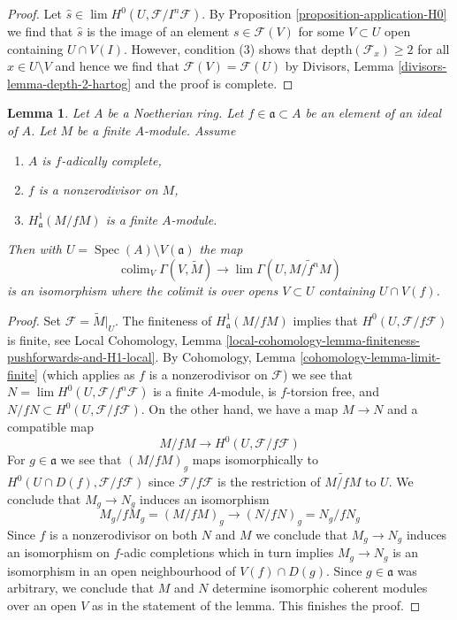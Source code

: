 \documentclass{stacks-project}
\theoremstyle{plain}
\newtheorem{lemma}[subsection]{Lemma}
\theoremstyle{definition}
\theoremstyle{remark}
\numberwithin{equation}{subsection}
\def\lim{\mathop{\mathrm{lim}}\nolimits}
\def\colim{\mathop{\mathrm{colim}}\nolimits}
\def\Spec{\mathop{\mathrm{Spec}}}
\begin{document}
\begin{proof}
Let $\hat s \in \lim H^0(U, \mathcal{F}/I^n\mathcal{F})$.
By Proposition \ref{proposition-application-H0}
we find that $\hat s$ is the image of an element $s \in \mathcal{F}(V)$
for some $V \subset U$ open containing $U \cap V(I)$.
However, condition (3) shows that $\text{depth}(\mathcal{F}_x) \geq 2$
for all $x \in U \setminus V$ and hence we find that
$\mathcal{F}(V) = \mathcal{F}(U)$ by
Divisors, Lemma \ref{divisors-lemma-depth-2-hartog}
and the proof is complete.
\end{proof}

\begin{lemma}
\label{lemma-alternative-colim-H0}
Let $A$ be a Noetherian ring. Let $f \in \mathfrak a \subset A$
be an element of an ideal of $A$. Let $M$ be a finite $A$-module.
Assume
\begin{enumerate}
\item $A$ is $f$-adically complete,
\item $f$ is a nonzerodivisor on $M$,
\item $H^1_\mathfrak a(M/fM)$ is a finite $A$-module.
\end{enumerate}
Then with $U = \Spec(A) \setminus V(\mathfrak a)$ the map
$$
\colim_V \Gamma(V, \widetilde{M})
\longrightarrow
\lim \Gamma(U, \widetilde{M/f^nM})
$$
is an isomorphism where the colimit is over opens $V \subset U$
containing $U \cap V(f)$.
\end{lemma}

\begin{proof}
Set $\mathcal{F} = \widetilde{M}|_U$.
The finiteness of $H^1_\mathfrak a(M/fM)$ implies that
$H^0(U, \mathcal{F}/f\mathcal{F})$ is finite, see
Local Cohomology, Lemma
\ref{local-cohomology-lemma-finiteness-pushforwards-and-H1-local}.
By Cohomology, Lemma \ref{cohomology-lemma-limit-finite}
(which applies as $f$ is a nonzerodivisor on $\mathcal{F}$)
we see that $N = \lim H^0(U, \mathcal{F}/f^n\mathcal{F})$
is a finite $A$-module, is $f$-torsion free, and
$N/fN \subset H^0(U, \mathcal{F}/f\mathcal{F})$.
On the other hand, we have a map $M \to N$ and a compatible map
$$
M/fM \longrightarrow H^0(U, \mathcal{F}/f\mathcal{F})
$$
For $g \in \mathfrak a$ we see that $(M/fM)_g$ maps isomorphically
to $H^0(U \cap D(f), \mathcal{F}/f\mathcal{F})$ since
$\mathcal{F}/f\mathcal{F}$ is the restriction of $\widetilde{M/fM}$ to $U$.
We conclude that $M_g \to N_g$ induces an isomorphism
$$
M_g/fM_g = (M/fM)_g \to (N/fN)_g = N_g/fN_g
$$
Since $f$ is a nonzerodivisor on both $N$ and $M$ we conclude
that $M_g \to N_g$ induces an isomorphism on $f$-adic completions
which in turn implies $M_g \to N_g$ is an isomorphism in an open
neighbourhood of $V(f) \cap D(g)$.
Since $g \in \mathfrak a$ was arbitrary, we conclude that $M$ and $N$
determine isomorphic coherent modules over an open $V$
as in the statement of the lemma. This finishes the proof.
\end{proof}
\end{document}
